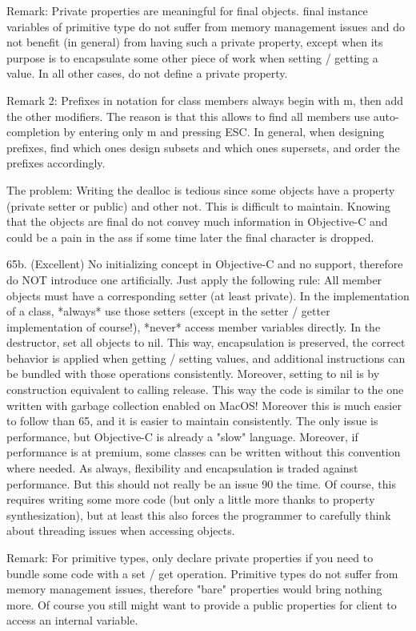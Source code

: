 Remark: Private properties are meaningful for final objects. final instance
variables of primitive type do not suffer from memory management issues and
do not benefit (in general) from having such a private property, except when
its purpose is to encapsulate some other piece of work when setting /
getting a value. In all other cases, do not define a private property.

Remark 2: Prefixes in notation for class members always begin with m, then
add the other modifiers. The reason is that this allows to find all members
use auto-completion by entering only m and pressing ESC. In general, when
designing prefixes, find which ones design subsets and which ones supersets,
and order the prefixes accordingly.

The problem: Writing the dealloc is tedious since some objects have a
property (private setter or public) and other not. This is difficult to
maintain. Knowing that the objects are final do not convey much information
in Objective-C and could be a pain in the ass if some time later the final
character is dropped.

65b. (Excellent) No initializing concept in Objective-C and no support,
therefore do NOT introduce one artificially. Just apply the following rule:
All member objects must have a corresponding setter (at least private). In
the implementation of a class, *always* use those setters (except in the
setter / getter implementation of course!), *never* access member variables
directly. In the destructor, set all objects to nil.
This way, encapsulation is preserved, the correct behavior is applied when
getting / setting values, and additional instructions can be bundled with
those operations consistently. Moreover, setting to nil is by construction
equivalent to calling release. This way the code is similar to the one
written with garbage collection enabled on MacOS! Moreover this is much
easier to follow than 65, and it is easier to maintain consistently. The
only issue is performance, but Objective-C is already a "slow" language.
Moreover, if performance is at premium, some classes can be written without
this convention where needed. As always, flexibility and encapsulation is
traded against performance. But this should not really be an issue 90%
the time. Of course, this requires writing some more code (but only a little
more thanks to property synthesization), but at least this also forces the
programmer to carefully think about threading issues when accessing objects.

Remark: For primitive types, only declare private properties if you need to
bundle some code with a set / get operation. Primitive types do not suffer
from memory management issues, therefore "bare" properties would bring
nothing more. Of course you still might want to provide a public properties
for client to access an internal variable.

